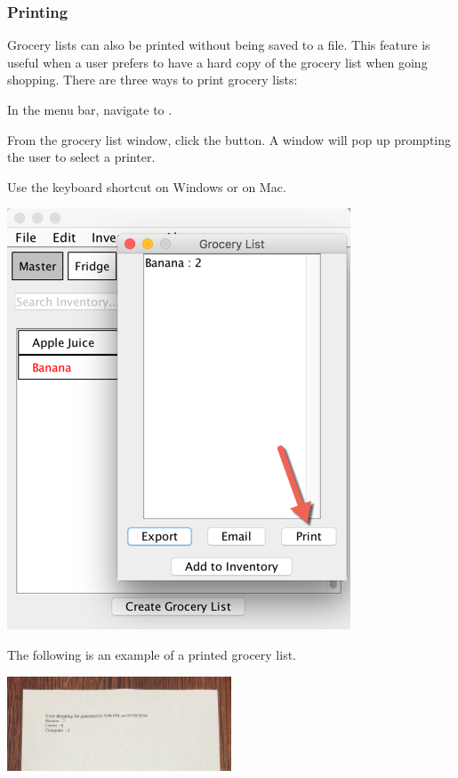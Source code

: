 \documentclass[letterpaper,12pt]{article}
\renewenvironment{enumerate}[1]{\begin{compactenum}#1}{\end{compactenum}}
\begin{document}
		
		\subsubsection{Printing}
Grocery lists can also be printed without being saved to a file. This feature is useful when a user prefers to have a hard copy of the grocery list when going shopping. There are three ways to print grocery lists:

\begin{enumerate}
\item In the menu bar, navigate to . 
\item From the grocery list window, click the  button. A window will pop up prompting the user to select a printer.
\item Use the keyboard shortcut  on Windows or  on Mac.
\end{enumerate}
		
		
	\centerline{\includegraphics[scale=0.5]{03.png}}
	
	
	The following is an example of a printed grocery list. \\
	
	\centerline{\includegraphics[width=0.5\textwidth]{crop.png}}
		
\end{document}
